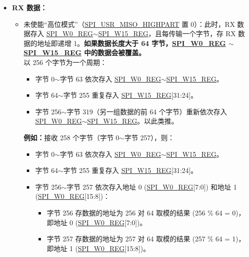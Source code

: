 \documentclass[main\_\_CN.tex]{subfiles}
\begin{document}
\begin{itemize}
\begin{itemize}
        
    \end{itemize}
    \item \textbf{RX 数据：}
    \begin{itemize}
        \item 未使能“高位模式”（\hyperref[fielddesc:SPIUSRMISOHIGHPART]{SPI\_USR\_MISO\_HIGHPART} 置 0）：此时，RX 数据存入 \hyperref[regdesc:SPIW0REG]{SPI\_W0\_REG}$\sim$\hyperref[regdesc:SPIW15REG]{SPI\_W15\_REG}，且每传输一个字节，存 RX 数据的地址即递增 1。\textbf{如果数据长度大于 64 字节，\hyperref[regdesc:SPIW0REG]{SPI\_W0\_REG} $\sim$ \hyperref[regdesc:SPIW15REG]{SPI\_W15\_REG} 中的数据会被覆盖。}\\
        以 256 个字节为一个周期：
        \begin{itemize}
            \item 字节 0$\sim$字节 63 依次存入 \hyperref[regdesc:SPIW0REG]{SPI\_W0\_REG}$\sim$\hyperref[regdesc:SPIW15REG]{SPI\_W15\_REG}。
            \item 字节 64$\sim$字节 255 重复存入 \hyperref[regdesc:SPIW15REG]{SPI\_W15\_REG}[31:24]。
            \item 字节 256$\sim$字节 319（另一组数据的前 64 个字节）重新依次存入 \hyperref[regdesc:SPIW0REG]{SPI\_W0\_REG}$\sim$\hyperref[regdesc:SPIW15REG]{SPI\_W15\_REG}。以此类推。
        \end{itemize}
        \textbf{例如：}接收 258 个字节（字节 0$\sim$字节 257），则：
        \begin{itemize}
            \item 字节 0$\sim$字节 63 依次存入 \hyperref[regdesc:SPIW0REG]{SPI\_W0\_REG}$\sim$\hyperref[regdesc:SPIW15REG]{SPI\_W15\_REG}。
            \item 字节 64$\sim$字节 255 重复存入 \hyperref[regdesc:SPIW15REG]{SPI\_W15\_REG}[31:24]。
            \item 字节 256$\sim$字节 257 依次存入地址 0 (\hyperref[regdesc:SPIW0REG]{SPI\_W0\_REG}[7:0]) 和地址 1 (\hyperref[regdesc:SPIW0REG]{SPI\_W0\_REG}[15:8])：
            \begin{itemize}
                \item 字节 256 存数据的地址为 256 对 64 取模的结果 (256 \% 64 = 0)，即地址 0 (\hyperref[regdesc:SPIW0REG]{SPI\_W0\_REG}[7:0])。
                \item 字节 257 存数据的地址为 257 对 64 取模的结果 (257 \% 64 = 1)，即地址 1 (\hyperref[regdesc:SPIW0REG]{SPI\_W0\_REG}[15:8])。
            \end{itemize}
        \end{itemize}

\end{itemize}
\end{itemize}
\end{document}
